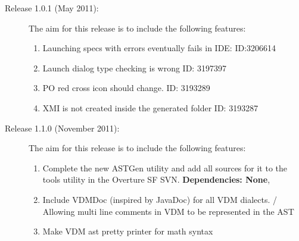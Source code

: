 \documentclass{overturerep}
\newcommand{\developer}[1]{{\scriptsize \fbox{#1}}}
\begin{document}
\begin{description}
\item[Release 1.0.1 (May 2011):] The aim for this release is to
  include the following features:  
\begin{enumerate}
\item Launching specs with errors eventually fails in IDE: ID:3206614
\item Launch dialog type checking is wrong ID: 3197397
\item PO red cross icon should change. ID: 3193289
\item XMI is not created inside the generated folder ID: 3193287
\end{enumerate}
\end{description}

\begin{description}
\item[Release 1.1.0 (November 2011):] The aim for this release is to
  include the following features:  
\begin{enumerate}

\item Complete the new ASTGen utility and add all sources for it to
  the tools utility in the Overture SF SVN. \developer{NickBattle} \textbf{Dependencies: None},\label{completeAST}
  
   \item Include VDMDoc (inspired by JavaDoc) for all VDM dialects. / Allowing multi line comments in VDM to be represented in the AST \developer{??}
   \item Make VDM ast pretty printer for math syntax
   
\end{enumerate}
\end{description}
\end{document}
